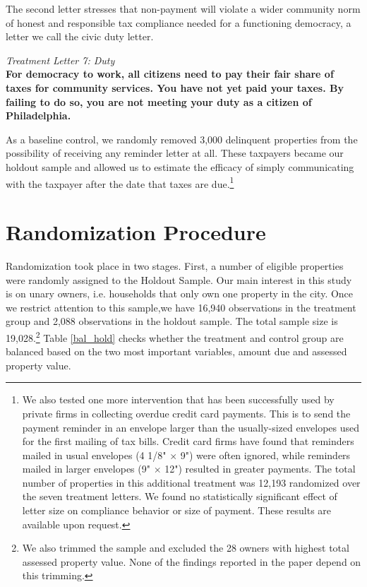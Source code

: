 \documentclass[12pt]{article}
\begin{document}
The second letter stresses that non-payment will violate a wider
community norm of honest and responsible tax compliance needed for a
functioning democracy, a letter we call the civic duty letter. 

{\it Treatment Letter 7: Duty } \\ {\bf For democracy to work, all
  citizens need to pay their fair share of taxes for community
  services. You have not yet paid your taxes. By failing to do so, you
  are not meeting your duty as a citizen of Philadelphia.}


As a baseline control, we randomly removed 3,000 delinquent properties
from the possibility of receiving any reminder letter at all.  These
taxpayers became our holdout sample and allowed us to estimate the
efficacy of simply communicating with the taxpayer after the date that
taxes are due.\footnote{We also tested one more intervention that has been
  successfully used by private firms in collecting overdue credit card
  payments.  This is to send the payment reminder in an envelope
  larger than the usually-sized envelopes used for the first mailing
  of tax bills.  Credit card firms have found that reminders mailed in
  usual envelopes (4 1/8" $\times$ 9") were often ignored, while reminders
  mailed in larger envelopes (9" $\times$ 12") resulted in greater payments.
  The total number of properties in this additional treatment was
  12,193 randomized over the seven treatment letters.  We found no
  statistically significant effect of letter size on compliance
  behavior or size of payment.  These results are available upon
  request.}
  
\section{Randomization Procedure}

Randomization took place in two stages.  First, a number of eligible
properties were randomly assigned to the Holdout Sample.  Our main
interest in this study is on unary owners, i.e. households that only
own one property in the city. Once we restrict attention to this
sample,we have 16,940 observations in the treatment group and
2,088 observations in the holdout sample.  The total sample size is
19,028.\footnote{We also trimmed the sample and excluded the 28
  owners with highest total assessed property value. None of the
  findings reported in the paper depend on this trimming.}  Table
\ref{bal_hold} checks whether the treatment and control group are
balanced based on the two most important variables, amount due and
assessed property value.
\end{document}
